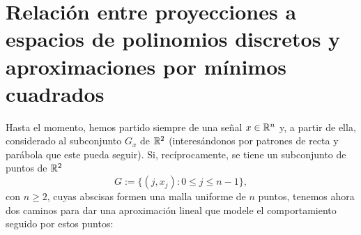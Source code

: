 
\section{Relación entre proyecciones a espacios de polinomios discretos y aproximaciones por mínimos cuadrados}
\label{Relación entre proyecciones a espacios de polinomios discretos y aproximaciones por mínimos cuadrados}

Hasta el momento, hemos partido siempre
de una señal $x \in \mathbb{R}^{n}$
y, a partir de ella, considerado al subconjunto $G_{x}$ 
de $\mathbb{R}^{2}$ (interesándonos por patrones de 
recta y parábola que este pueda seguir).
Si, recíprocamente, se tiene un 
subconjunto de puntos de $\mathbb{R}^{2}$ 
\begin{equation}
\label{eq: Halloween!}
G:=\{(j, x_{j}): 0 \leq j \leq n-1 \},
\end{equation}
con $n \geq 2$,
cuyas abscisas formen una malla uniforme
de $n$ puntos, tenemos ahora dos caminos
para dar una aproximación lineal
que modele el comportamiento 
seguido por estos puntos:

